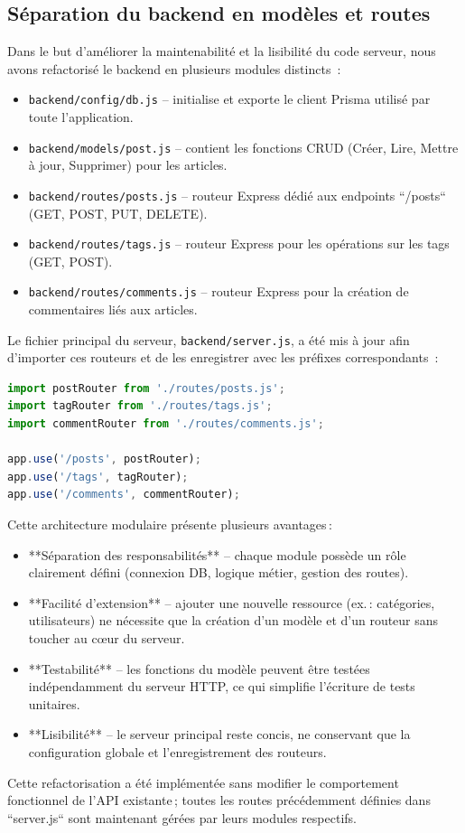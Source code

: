 \subsection{Séparation du backend en modèles et routes}
Dans le but d’améliorer la maintenabilité et la lisibilité du code serveur, nous avons refactorisé le backend en plusieurs modules distincts :
\begin{itemize}
  \item \texttt{backend/config/db.js} – initialise et exporte le client Prisma utilisé par toute l’application.
  \item \texttt{backend/models/post.js} – contient les fonctions CRUD (Créer, Lire, Mettre à jour, Supprimer) pour les articles.
  \item \texttt{backend/routes/posts.js} – routeur Express dédié aux endpoints ``/posts`` (GET, POST, PUT, DELETE).
  \item \texttt{backend/routes/tags.js} – routeur Express pour les opérations sur les tags (GET, POST).
  \item \texttt{backend/routes/comments.js} – routeur Express pour la création de commentaires liés aux articles.
\end{itemize}
Le fichier principal du serveur, \texttt{backend/server.js}, a été mis à jour afin d’importer ces routeurs et de les enregistrer avec les préfixes correspondants :
\begin{lstlisting}[language=JavaScript]
import postRouter from './routes/posts.js';
import tagRouter from './routes/tags.js';
import commentRouter from './routes/comments.js';

app.use('/posts', postRouter);
app.use('/tags', tagRouter);
app.use('/comments', commentRouter);
\end{lstlisting}
Cette architecture modulaire présente plusieurs avantages :
\begin{itemize}
  \item **Séparation des responsabilités** – chaque module possède un rôle clairement défini (connexion DB, logique métier, gestion des routes).
  \item **Facilité d’extension** – ajouter une nouvelle ressource (ex. : catégories, utilisateurs) ne nécessite que la création d’un modèle et d’un routeur sans toucher au cœur du serveur.
  \item **Testabilité** – les fonctions du modèle peuvent être testées indépendamment du serveur HTTP, ce qui simplifie l’écriture de tests unitaires.
  \item **Lisibilité** – le serveur principal reste concis, ne conservant que la configuration globale et l’enregistrement des routeurs.
\end{itemize}
Cette refactorisation a été implémentée sans modifier le comportement fonctionnel de l’API existante ; toutes les routes précédemment définies dans ``server.js`` sont maintenant gérées par leurs modules respectifs.

